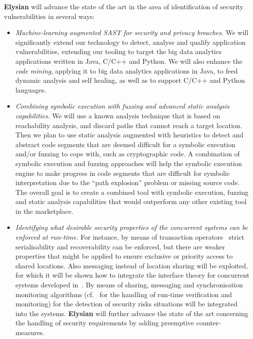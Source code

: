 \documentclass[a4paper,11pt]{article}
\newcommand{\project}[1]{\textbf{#1}\xspace}
\newcommand{\SECURITY}{\project{Elysian}}
\newcommand{\TheProject}{\SECURITY}
\begin{document}
\begin{mdframed}[backgroundcolor=gray!10]
\TheProject{} will advance the state of the art in the area of identification of security vulnerabilities in several ways:
\begin{itemize}
\item \emph{Machine-learning augmented SAST for security and privacy breaches.} We will significantly extend our technology to detect, analyse and qualify application vulnerabilities, extending our tooling to target the big data analytics applications written in Java, C/C++ and Python. We will also enhance the \emph{code mining}, applying it to big data analytics applications in Java, to feed dynamic analysis and self healing, as well as to support C/C++ and Python languages.
\item \emph{Combining symbolic execution with fuzzing and advanced static analysis capabilities.} We will use a known analysis technique that is based on reachability analysis, and discard paths that cannot reach a target location. Then we plan to use static analysis augmented with heuristics to detect and abstract code segments that are deemed difficult for a symbolic execution and/or fuzzing to cope with, such as cryptographic code. A combination of symbolic execution and fuzzing approaches will help the symbolic execution engine to make progress in code segments that are difficult for symbolic interpretation due to the “path explosion” problem or missing source code. The overall goal is to create a combined tool with symbolic execution, fuzzing and static analysis capabilities that would outperform any other existing tool in the marketplace.
\item \emph{Identifying what desirable security properties of the concurrent systems can be enforced at run-time.} For instance, by means of transaction operators~\cite{BorgerSW16} strict serialisability and recoverability can be enforced, but there are weaker properties that might be applied to ensure exclusive or priority access to shared locations. Also messaging instead of location sharing will be exploited, for which it will be shown how to integrate the interface theory for concurrent systems developed in~\cite{BauerHW11}. By means of sharing, messaging and synchronisation monitoring algorithms (cf.~\cite{DiekertL14} for the handling of run-time verification and monitoring) for the detection of security risks situations will be integrated into the systems. \TheProject{} will further advance the state of the art concerning the handling of security requirements by adding preemptive counter-measures.
\end{itemize}
\end{mdframed}
\end{document}
